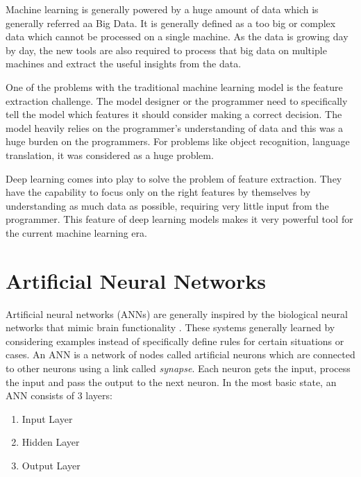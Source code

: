 Machine learning is generally powered by a huge amount of data which is generally referred aa Big Data. It is generally defined as a too big or complex data which cannot be processed on a single machine. As the data is growing day by day, the new tools are also required to process that big data on multiple machines and extract the useful insights from the data.


One of the problems with the traditional machine learning model is the feature extraction challenge. The model designer or the programmer need to specifically tell the model which features it should consider making a correct decision. The model heavily relies on the programmer's understanding of data and this was a huge burden on the programmers. For problems like object recognition, language translation, it was considered as a huge problem.

Deep learning comes into play to solve the problem of feature extraction. They have the capability to focus only on the right features by themselves by understanding as much data as possible, requiring very little input from the programmer. This feature of deep learning models makes it very powerful tool for the current machine learning era.




\section{Artificial Neural Networks}
Artificial neural networks (ANNs) are generally inspired by the biological neural networks that mimic brain functionality \cite{wiki:ann}. These systems generally learned by considering examples instead of specifically define rules for certain situations or cases. An ANN is a network of nodes called artificial neurons which are connected to other neurons using a link called \textit{synapse}. Each neuron gets the input, process the input and pass the output to the next neuron.
In the most basic state, an ANN consists of 3 layers:

\begin{enumerate}
	\item Input Layer
	\item Hidden Layer
	\item Output Layer
\end{enumerate}

